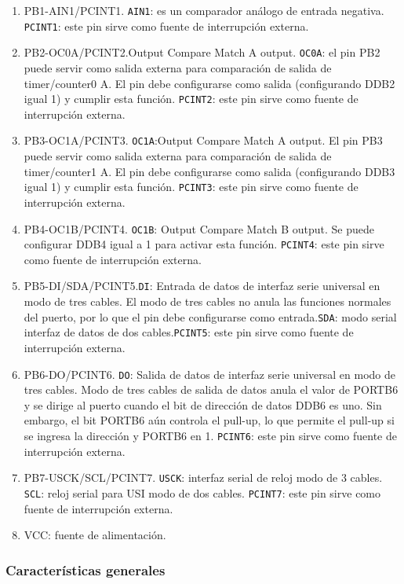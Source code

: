 \begin{enumerate}
\item PB1-AIN1/PCINT1. \texttt{AIN1}: es un comparador análogo de entrada negativa. \texttt{PCINT1}: este pin sirve como fuente de interrupción externa.
\item PB2-OC0A/PCINT2.Output Compare Match A output. \texttt{OC0A}: el pin PB2 puede servir como salida externa para comparación de salida de timer/counter0 A. El pin debe configurarse como salida (configurando DDB2 igual 1) y cumplir esta función. \texttt{PCINT2}: este pin sirve como fuente de interrupción externa.
\item PB3-OC1A/PCINT3. \texttt{OC1A}:Output Compare Match A output. El pin PB3 puede servir como salida externa para comparación de salida de timer/counter1 A. El pin debe configurarse como salida (configurando DDB3 igual 1) y cumplir esta función. \texttt{PCINT3}: este pin sirve como fuente de interrupción externa.
\item PB4-OC1B/PCINT4. \texttt{OC1B}: Output Compare Match B output. Se puede configurar DDB4 igual a 1 para activar esta función. \texttt{PCINT4}: este pin sirve como fuente de interrupción externa.
\item PB5-DI/SDA/PCINT5.\texttt{DI}: Entrada de datos de interfaz serie universal en modo de tres cables. El modo de tres cables no anula las funciones normales del puerto, por lo que el pin debe configurarse como entrada.\texttt{SDA}: modo serial interfaz de datos de dos cables.\texttt{PCINT5}: este pin sirve como fuente de interrupción externa.
\item PB6-DO/PCINT6. \texttt{DO}: Salida de datos de interfaz serie universal en modo de tres cables. Modo de tres cables de salida de datos anula el valor de PORTB6 y se dirige al puerto cuando el bit de dirección de datos DDB6 es uno. Sin embargo, el bit PORTB6 aún controla el pull-up, lo que permite el pull-up si se ingresa la dirección y PORTB6 en 1. \texttt{PCINT6}: este pin sirve como fuente de interrupción externa.
\item PB7-USCK/SCL/PCINT7. \texttt{USCK}: interfaz serial de reloj modo de 3 cables. \texttt{SCL}: reloj serial para USI modo de dos cables. \texttt{PCINT7}: este pin sirve como fuente de interrupción externa.
\item VCC: fuente de alimentación.
\end{enumerate}

\subsubsection*{Características generales}
